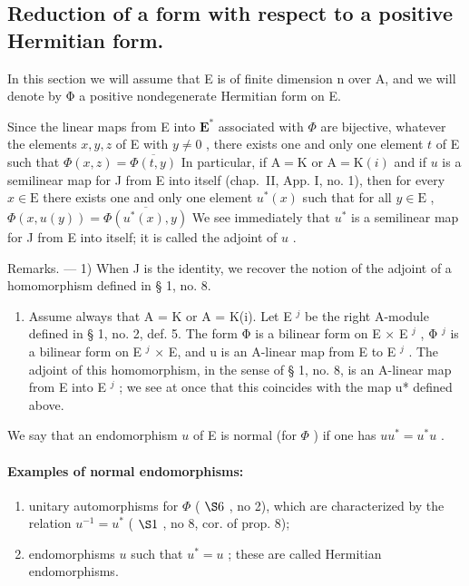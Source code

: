 \subsection{Reduction of a form with respect to a positive Hermitian form.}

In this section we will assume that E is of finite dimension n over A, and we will denote by Φ a positive nondegenerate Hermitian form on E.

Since the linear maps from E into \(\mathbf{E}^*\) associated with \(\Phi\) are bijective, whatever the elements \(x, y, z\) of E with \(y \neq 0\) , there exists one and only one element \(t\) of E such that \(\Phi(x, z) = \overline{\Phi(t, y)}\) In particular, if \(\mathrm{A} = \mathrm{K}\) or \(\mathrm{A} = \mathrm{K}(i)\) and if \(u\) is a semilinear map for J from E into itself (chap.~II, App. I, no. 1), then for every \(x \in \mathrm{E}\) there exists one and only one element \(u^*(x)\) such that for all \(y \in \mathrm{E}\) , \(\Phi(x, u(y)) = \overline{\Phi(u^*(x), y)}\) We see immediately that \(u^*\) is a semilinear map for J from E into itself; it is called the adjoint of \(u\) .

Remarks. --- 1) When J is the identity, we recover the notion of the adjoint of a homomorphism defined in § 1, no. 8.

\begin{enumerate}
\def\labelenumi{\arabic{enumi})}
\setcounter{enumi}{1}
\tightlist
\item
  Assume always that A = K or A = K(i). Let E \(^{j}\) be the right A-module defined in § 1, no. 2, def. 5. The form Φ is a bilinear form on E × E \(^{j}\) , Φ \(^{j}\) is a bilinear form on E \(^{j}\) × E, and u is an A-linear map from E to E \(^{j}\) . The adjoint of this homomorphism, in the sense of § 1, no. 8, is an A-linear map from E into E \(^{j}\) ; we see at once that this coincides with the map u* defined above.
\end{enumerate}

We say that an endomorphism \(u\) of E is normal (for \(\Phi\) ) if one has \(uu^{*}=u^{*}u\) .
\relax{}
\paragraph{Examples of normal endomorphisms:}

\begin{enumerate}
\def\labelenumi{\arabic{enumi})}
\item
  unitary automorphisms for \(\Phi\) ( \(\S 6\) , no 2), which are characterized by the relation \(u^{-1} = u^{*}\) ( \(\S 1\) , no 8, cor. of prop. 8);
\item
  endomorphisms \(u\) such that \(u^{*}=u\) ; these are called Hermitian endomorphisms.
\end{enumerate}

